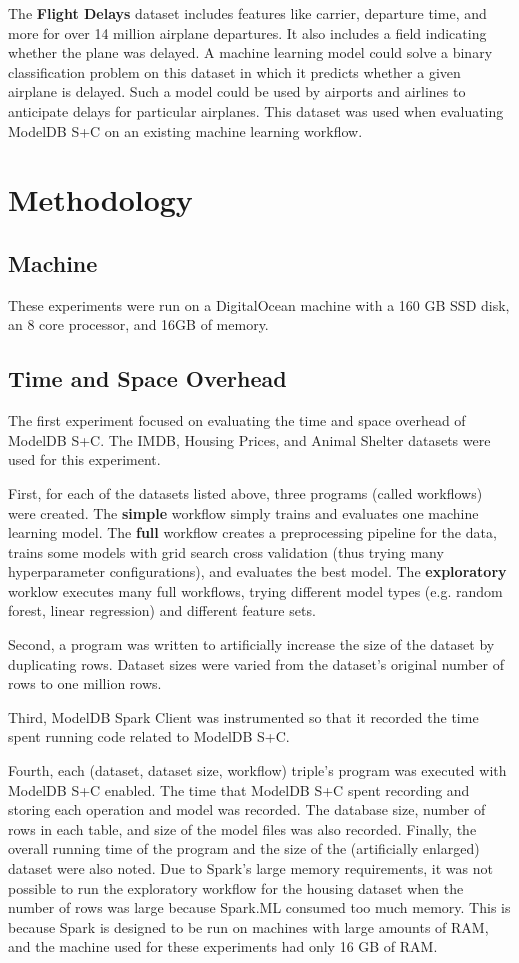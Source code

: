 The \textbf{Flight Delays} dataset \cite{airline} includes features like carrier, departure
time, and more for over 14 million airplane departures. It also includes a field indicating whether
the plane was delayed. A machine learning model could solve a binary classification problem on this dataset in which
it predicts whether a given airplane is delayed. Such a model could be used by airports and airlines
to anticipate delays for particular airplanes. This dataset was used when evaluating ModelDB S+C
on an existing machine learning workflow.

\section{Methodology}
\subsection{Machine}
These experiments were run on a DigitalOcean machine with a 160 GB SSD disk, an 8 core processor,
and 16GB of memory.

\subsection{Time and Space Overhead}
The first experiment focused on evaluating the time and space overhead of ModelDB S+C.
The IMDB, Housing Prices, and Animal Shelter datasets were used for this experiment. 

First, for each of the datasets listed above, three programs (called workflows) were
created. The \textbf{simple} workflow simply trains and evaluates one machine learning model. 
The \textbf{full} workflow creates a preprocessing pipeline for the data, trains 
some models with grid search cross validation (thus trying many hyperparameter configurations), 
and evaluates the best model. The \textbf{exploratory} worklow executes many full workflows, 
trying different model types (e.g. random forest, linear regression) and different feature sets.

Second, a program was written to artificially increase the size of the dataset by duplicating rows.
Dataset sizes were varied from the dataset's original number of rows to one million rows.

Third, ModelDB Spark Client was instrumented so that it recorded the time spent running code related
to ModelDB S+C.

Fourth, each (dataset, dataset size, workflow) triple's program was executed with ModelDB S+C enabled. The time that ModelDB S+C spent
recording and storing each operation and model was recorded. The database size, number of rows in each table, and size of the model
files was also recorded. Finally, the overall running time of the program and the size of the (artificially enlarged) dataset
were also noted. Due to Spark's large memory requirements, it was not possible to run the exploratory workflow for the 
housing dataset when the number of rows was large because Spark.ML consumed too much memory. This is because Spark is designed
to be run on machines with large amounts of RAM, and the machine used for these experiments had only 16 GB of RAM.


